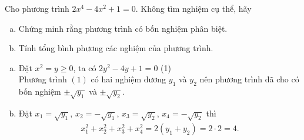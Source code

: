 	\begin{bt}
		Cho phương trình $2x^4 - 4x^2 + 1=0$. Không tìm nghiệm cụ thể, hãy
		\begin{enumerate}[a)]
			\item Chứng minh rằng phương trình có bốn nghiệm phân biệt.
			\item Tính tổng bình phương các nghiệm của phương trình.
		\end{enumerate}
		\loigiai 
		{
			\begin{enumerate}[a)]
				\item Đặt $x^2 = y \ge 0$, ta có $2y^2 - 4y + 1 = 0$ \hfill (1) \\
				Phương trình $(1)$ có hai nghiệm dương $y_1$ và $y_2$ nên phương trình đã cho có bốn nghiệm $\pm \sqrt{y_1}$ và $\pm \sqrt{y_2}$.
				\item Đặt $x_1 = \sqrt{y_1}$, $x_2 = -\sqrt{y_1}$, $x_3 = \sqrt{y_2}$, $x_4 = -\sqrt{y_2}$ thì 
				\begin{align*}
					x_1^2 + x_2^2 + x_3^2 + x_4^2 = 2(y_1 + y_2) = 2 \cdot 2 = 4.
				\end{align*}
			\end{enumerate}
		}
	\end{bt}

